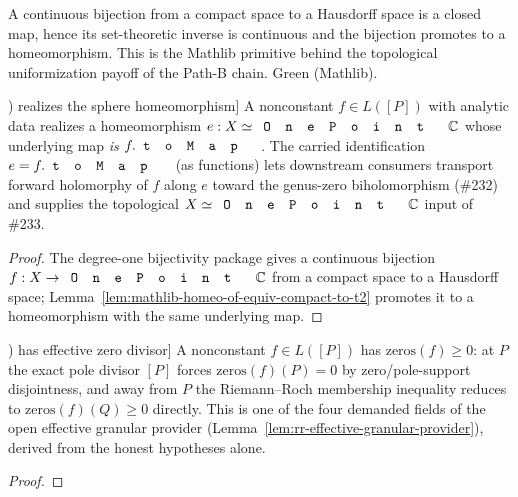 \begin{lemma}
\label{lem:mathlib-homeo-of-equiv-compact-to-t2}
A continuous bijection from a compact space to a Hausdorff space is a closed
map, hence its set-theoretic inverse is continuous and the bijection promotes
to a homeomorphism. This is the Mathlib primitive behind the topological
uniformization payoff of the Path-B chain. Green (Mathlib).
\leanok
\end{lemma}

\begin{lemma}[A nonconstant element of \(L([P])\) realizes the sphere homeomorphism]
\label{lem:rr-nonconstant-L-point-homeomorph-sphere}
A nonconstant \(f\in L([P])\) with analytic data realizes a homeomorphism
\(e : X\simeq\code{OnePoint}\,\C\) whose underlying map \emph{is}
\(f.\code{toMap}\). The carried identification \(e = f.\code{toMap}\) (as
functions) lets downstream consumers transport forward holomorphy of \(f\)
along \(e\) toward the genus-zero biholomorphism (\#232) and supplies the
topological \(X\simeq\code{OnePoint}\,\C\) input of \#233.
\leanok
\end{lemma}
\begin{proof}\leanok
The degree-one bijectivity package gives a continuous bijection
\(f : X\to\code{OnePoint}\,\C\) from a compact space to a Hausdorff space;
Lemma~\ref{lem:mathlib-homeo-of-equiv-compact-to-t2} promotes it to a
homeomorphism with the same underlying map.
\end{proof}

\begin{lemma}[A nonconstant element of \(L([P])\) has effective zero divisor]
\label{lem:rr-nonconstant-L-point-zero-divisor-effective}
A nonconstant \(f\in L([P])\) has \(\mathrm{zeros}(f)\ge 0\): at \(P\) the
exact pole divisor \([P]\) forces \(\mathrm{zeros}(f)(P)=0\) by
zero/pole-support disjointness, and away from \(P\) the Riemann--Roch
membership inequality reduces to \(\mathrm{zeros}(f)(Q)\ge 0\) directly. This
is one of the four demanded fields of the open effective granular provider
(Lemma~\ref{lem:rr-effective-granular-provider}), derived from the honest
hypotheses alone.
\leanok
\end{lemma}
\begin{proof}\leanok\end{proof}

